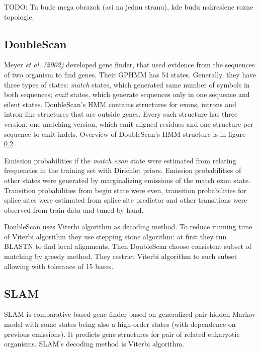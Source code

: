 TODO: Tu bude mega obrazok (asi na jednu stranu), kde budu nakreslene rozne
topologie.



\subsection{DoubleScan}
Meyer {\it et al. (2002)} developed gene finder, that used evidence from the
sequences of two organism to find genes. Their GPHMM has 54 states. Generally,
they have three types of states: {\it match} states, which generated same number
of symbols in both sequences;   {\it emit} states, which generate sequences only
in one sequence and silent states. DoubleScan's HMM contains structures for
exons, introns and intron-like structures that are outside genes. Every such
structure has three version: one matching version, which emit aligned residues
and one structure per sequence to emit indels.  Overview of DoubleScan's HMM
structure is in figure \ref{}. 
\nocite{Meyer2002}

Emission probabilities if the {\it match exon} state were estimated from
relating frequencies in the training set with Dirichlet priors.
Emission probabilities of other states were generated  by marginalizing
emissions of the match exon state. Transition probabilities from begin state
were even, transition probabilities for splice sites were estimated from splice
site predictor and other transitions were observed from train data and tuned by
hand.

DoubleScan uses Viterbi algorithm as decoding method.  To reduce running time of
Viterbi algorithm they use stepping stone algorithm: at first they run BLASTN to
find local alignments. Then DoubleScan choose consistent subset of matching by
greedy method. They restrict Viterbi algorithm to such subset allowing with
tolerance of 15 bases.

\subsection{SLAM} 

SLAM is comparative-based gene finder \cite{SLAM2003} based on generalized pair
hidden Markov model \cite{Alexanderson2004} with some states being also a
high-order states (with dependence on previous emissions).  It predicts gene
structures for pair of related eukaryotic organisms. SLAM's decoding method is
Viterbi algorithm. 

